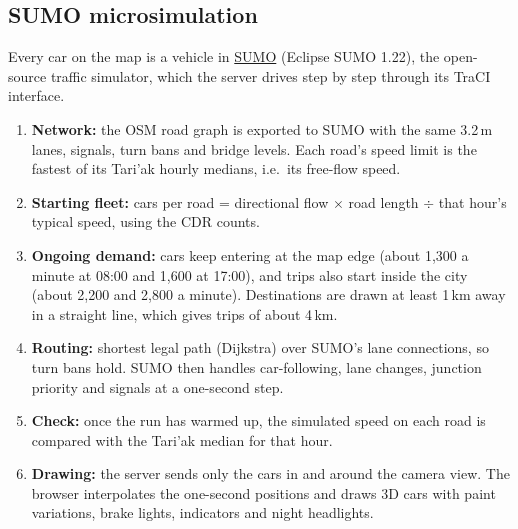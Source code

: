 \documentclass[10pt,a4paper]{article}
\begin{document}
\subsection{SUMO microsimulation}
Every car on the map is a vehicle in \href{https://eclipse.dev/sumo/}{SUMO} (Eclipse SUMO 1.22), the open-source traffic simulator, which the server drives step by step through its TraCI interface.
\begin{enumerate}[leftmargin=14pt]
\item \textbf{Network:} the OSM road graph is exported to SUMO with the same 3.2\,m lanes, signals, turn bans and bridge levels. Each road's speed limit is the fastest of its Tari'ak hourly medians, i.e.\ its free-flow speed.
\item \textbf{Starting fleet:} cars per road = directional flow $\times$ road length $\div$ that hour's typical speed, using the CDR counts.
\item \textbf{Ongoing demand:} cars keep entering at the map edge (about 1,300 a minute at 08:00 and 1,600 at 17:00), and trips also start inside the city (about 2,200 and 2,800 a minute). Destinations are drawn at least 1\,km away in a straight line, which gives trips of about 4\,km.
\item \textbf{Routing:} shortest legal path (Dijkstra) over SUMO's lane connections, so turn bans hold. SUMO then handles car-following, lane changes, junction priority and signals at a one-second step.
\item \textbf{Check:} once the run has warmed up, the simulated speed on each road is compared with the Tari'ak median for that hour.
\item \textbf{Drawing:} the server sends only the cars in and around the camera view. The browser interpolates the one-second positions and draws 3D cars with paint variations, brake lights, indicators and night headlights.
\end{enumerate}
\end{document}
